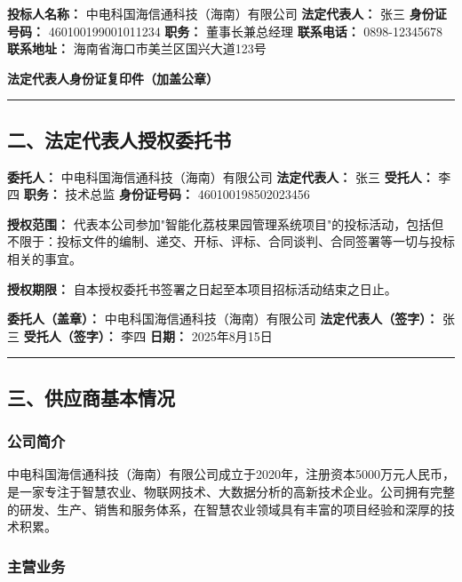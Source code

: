 \documentclass[12pt,a4paper]{article}
\begin{document}
\textbf{投标人名称：} 中电科国海信通科技（海南）有限公司
\textbf{法定代表人：} 张三
\textbf{身份证号码：} 460100199001011234
\textbf{职务：} 董事长兼总经理
\textbf{联系电话：} 0898-12345678
\textbf{联系地址：} 海南省海口市美兰区国兴大道123号

\textbf{法定代表人身份证复印件（加盖公章）}

\hrule


\subsection{二、法定代表人授权委托书}


\textbf{委托人：} 中电科国海信通科技（海南）有限公司
\textbf{法定代表人：} 张三
\textbf{受托人：} 李四
\textbf{职务：} 技术总监
\textbf{身份证号码：} 460100198502023456

\textbf{授权范围：} 代表本公司参加"智能化荔枝果园管理系统项目"的投标活动，包括但不限于：投标文件的编制、递交、开标、评标、合同谈判、合同签署等一切与投标相关的事宜。

\textbf{授权期限：} 自本授权委托书签署之日起至本项目招标活动结束之日止。

\textbf{委托人（盖章）：} 中电科国海信通科技（海南）有限公司
\textbf{法定代表人（签字）：} 张三
\textbf{受托人（签字）：} 李四
\textbf{日期：} 2025年8月15日

\hrule


\subsection{三、供应商基本情况}


\subsubsection{公司简介}

中电科国海信通科技（海南）有限公司成立于2020年，注册资本5000万元人民币，是一家专注于智慧农业、物联网技术、大数据分析的高新技术企业。公司拥有完整的研发、生产、销售和服务体系，在智慧农业领域具有丰富的项目经验和深厚的技术积累。

\subsubsection{主营业务}
\end{document}

